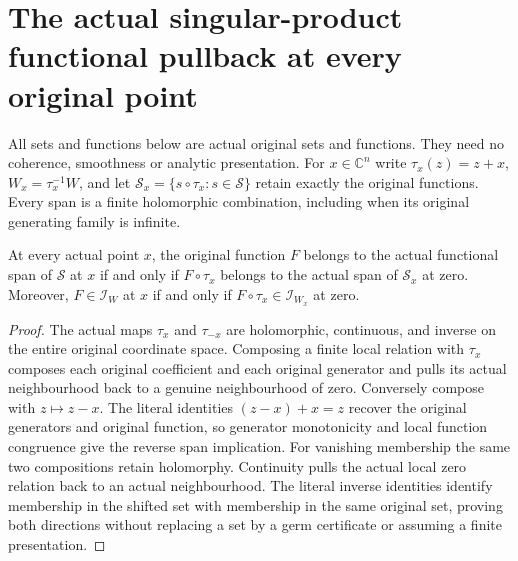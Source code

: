 \section{The actual singular-product functional pullback at every original point}

All sets and functions below are actual original sets and functions. They
need no coherence, smoothness or analytic presentation. For $x\in\mathbb C^n$
write $\tau_x(z)=z+x$, $W_x=\tau_x^{-1}W$, and let
$\mathcal S_x=\{s\circ\tau_x:s\in\mathcal S\}$ retain exactly the
original functions. Every span is a finite holomorphic combination,
including when its original generating family is infinite.

\begin{lemma}
\label{hir:actual-functional-translation-span-vanishing}
\leanok
At every actual point $x$, the original function $F$ belongs to the
actual functional span of $\mathcal S$ at $x$ if and only if
$F\circ\tau_x$ belongs to the actual span of $\mathcal S_x$ at zero.
Moreover, $F\in\mathcal I_W$ at $x$ if and only if
$F\circ\tau_x\in\mathcal I_{W_x}$ at zero.
\end{lemma}
\begin{proof}
The actual maps $\tau_x$ and $\tau_{-x}$ are holomorphic, continuous,
and inverse on the entire original coordinate space. Composing a
finite local relation with $\tau_x$ composes each original coefficient
and each original generator and pulls its actual neighbourhood back
to a genuine neighbourhood of zero. Conversely compose with
$z\mapsto z-x$. The literal identities $(z-x)+x=z$ recover the
original generators and original function, so generator monotonicity
and local function congruence give the reverse span implication.
For vanishing membership the same two compositions retain
holomorphy. Continuity pulls the actual local zero relation back to
an actual neighbourhood. The literal inverse identities identify
membership in the shifted set with membership in the same original
set, proving both directions without replacing a set by a germ
certificate or assuming a finite presentation.
\end{proof}


